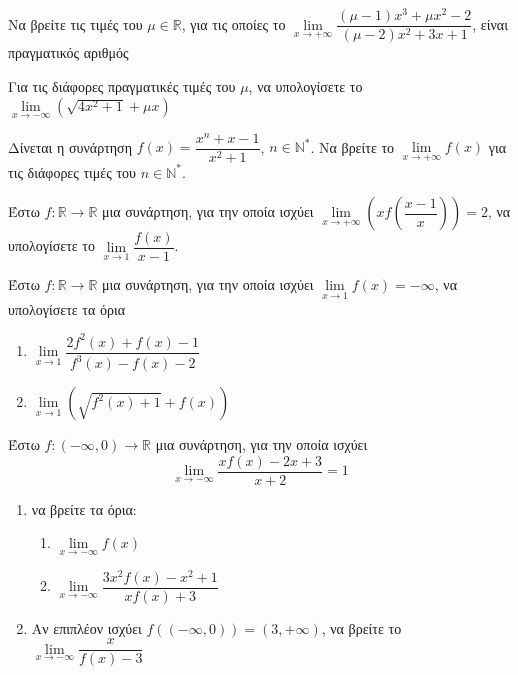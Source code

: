 \documentclass{presentation}
\begin{document}
\begin{askisi}
  Να βρείτε τις τιμές του $μ\in\mathbb{R}$, για τις οποίες το $\lim\limits_{x \to +\infty}{ \dfrac{(μ-1)x^3+μx^2-2}{(μ-2)x^2+3x+1}  }$, είναι πραγματικός αριθμός
\end{askisi}

\begin{askisi}
  Για τις διάφορες πραγματικές τιμές του $μ$, να υπολογίσετε το $\lim\limits_{x \to -\infty}{ \left( \sqrt{4x^2+1}+μx \right)  }$
\end{askisi}

\begin{askisi}
  Δίνεται η συνάρτηση $f(x)=\dfrac{x^n+x-1}{x^2+1}$, $n\in\mathbb{N}^*$. Να βρείτε το $\lim\limits_{x \to +\infty}{ f(x) } $ για τις διάφορες τιμές του $n\in\mathbb{N}^*$.
\end{askisi}

\begin{askisi}
  Έστω $f:\mathbb{R}\to\mathbb{R}$ μια συνάρτηση, για την οποία ισχύει $\lim\limits_{x \to +\infty}{ \left( xf\left( \dfrac{x-1}{x} \right)  \right)  }=2$, να υπολογίσετε το $\lim\limits_{x \to 1}{ \dfrac{f(x)}{x-1} }$.
\end{askisi}

\begin{askisi}
  Έστω $f:\mathbb{R}\to\mathbb{R}$ μια συνάρτηση, για την οποία ισχύει $\lim\limits_{x \to 1}{ f(x)  }=-\infty$, να υπολογίσετε τα όρια
  \begin{enumerate}
    \item $\lim\limits_{x \to 1}{ \dfrac{2f^2(x)+f(x)-1}{f^3(x)-f(x)-2} }$ \pause
    \item $\lim\limits_{x \to 1}{ \left( \sqrt{f^2(x)+1}+f(x) \right)  }$
  \end{enumerate}
\end{askisi}

\begin{askisi}
  Έστω $f:(-\infty,0)\to\mathbb{R}$ μια συνάρτηση, για την οποία ισχύει $$\lim\limits_{x \to -\infty}{ \dfrac{xf(x)-2x+3}{x+2}  }=1$$
  \begin{enumerate}[<+->]
    \item να βρείτε τα όρια:
          \begin{enumerate}
            \item $\lim\limits_{x \to -\infty}{ f(x) }$
            \item $\lim\limits_{x \to -\infty}{ \dfrac{3x^2f(x)-x^2+1}{xf(x)+3}  }$
          \end{enumerate}
    \item Αν επιπλέον ισχύει $f\left( (-\infty,0) \right)=(3,+\infty) $, να βρείτε το $\lim\limits_{x \to -\infty}{ \dfrac{x}{f(x)-3} }$
  \end{enumerate}
\end{askisi}
\end{document}
